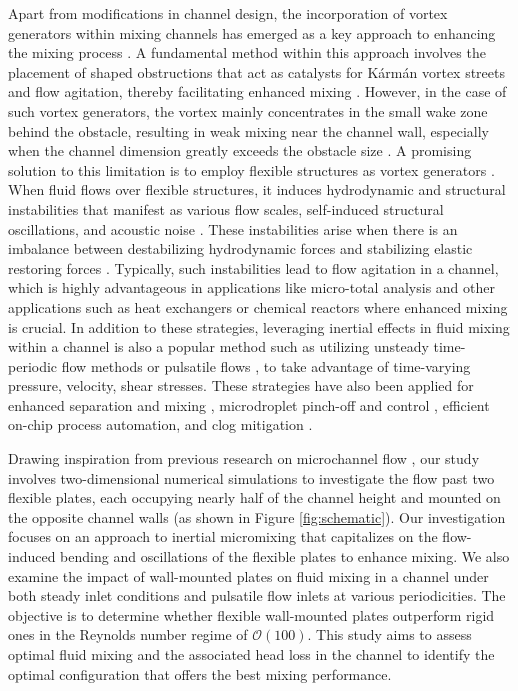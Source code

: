\documentclass[%
 aip,
 amsmath,amssymb,
 reprint,
]{revtex4-1}
\begin{document}
Apart from modifications in channel design, the incorporation of vortex generators within mixing channels has emerged as a key approach to enhancing the mixing process \citep{Ali2015,Khatavkar2007,Dadvand2019,Ali2016,Hsiao2014,Hosseini2021,Van_Loon2007,Eizadi2022}. A fundamental method within this approach involves the placement of shaped obstructions that act as catalysts for Kármán vortex streets and flow agitation, thereby facilitating enhanced mixing \citep{Abdelhamid2021,Yadav2021,Jing2022,Yu2017}. However, in the case of such vortex generators, the vortex mainly concentrates in the small wake zone behind the obstacle, resulting in weak mixing near the channel wall, especially when the channel dimension greatly exceeds the obstacle size \citep{Wang2020}. A promising solution to this limitation is to employ flexible structures as vortex generators \citep{Chen2020,Park2019,Saleh2019,Zhao2020,Pfister2020}. When fluid flows over flexible structures, it induces hydrodynamic and structural instabilities that manifest as various flow scales, self-induced structural oscillations, and acoustic noise \citep{Balachandar1999, Zhang2000, Mahadevan2004, Vandenberghe2004, Shelley2011}. These instabilities arise when there is an imbalance between destabilizing hydrodynamic forces and stabilizing elastic restoring forces \citep{Taneda1968, Zhang2000, Watanabe2002, Eloy2008, ZhuPeskin2002, Alben2008}. Typically, such instabilities lead to flow agitation in a channel, which is highly advantageous in applications like micro-total analysis \citep{Manz2002} and other applications such as heat exchangers or chemical reactors where enhanced mixing is crucial. In addition to these strategies, leveraging inertial effects in fluid mixing within a channel is also a popular method \citep{Carlo2009,Carlo2007} such as utilizing unsteady time-periodic flow methods or pulsatile flows \citep{Cai2017}, to take advantage of time-varying pressure, velocity, shear stresses. These strategies have also been applied for enhanced separation and mixing \citep{Ward2015}, microdroplet pinch-off and control \citep{Zhu2017, SENAPATI2019}, efficient on-chip process automation, and clog mitigation \citep{Mehendale2018}.

Drawing inspiration from previous research on microchannel flow \cite{Khatvakar2007, LambertRangel2010, Gleeson2005, Pathak2012, Kim2010, Stone2001, Stone2004}, our study involves two-dimensional numerical simulations to investigate the flow past two flexible plates, each occupying nearly half of the channel height and mounted on the opposite channel walls (as shown in Figure \ref{fig:schematic}). Our investigation focuses on an approach to inertial micromixing that capitalizes on the flow-induced bending and oscillations of the flexible plates to enhance mixing. We also examine the impact of wall-mounted plates on fluid mixing in a channel under both steady inlet conditions and pulsatile flow inlets at various periodicities. The objective is to determine whether flexible wall-mounted plates outperform rigid ones in the Reynolds number regime of $\mathcal{O}(100)$. This study aims to assess optimal fluid mixing and the associated head loss in the channel to identify the optimal configuration that offers the best mixing performance.
\end{document}
